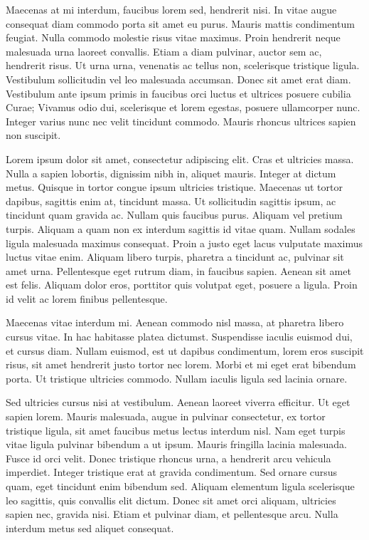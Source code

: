 Maecenas at mi interdum, faucibus lorem sed, hendrerit nisi. In vitae
augue consequat diam commodo porta sit amet eu purus. Mauris mattis
condimentum feugiat. Nulla commodo molestie risus vitae maximus. Proin
hendrerit neque malesuada urna laoreet convallis. Etiam a diam
pulvinar, auctor sem ac, hendrerit risus. Ut urna urna, venenatis ac
tellus non, scelerisque tristique ligula. Vestibulum sollicitudin vel
leo malesuada accumsan. Donec sit amet erat diam. Vestibulum ante
ipsum primis in faucibus orci luctus et ultrices posuere cubilia
Curae; Vivamus odio dui, scelerisque et lorem egestas, posuere
ullamcorper nunc. Integer varius nunc nec velit tincidunt
commodo. Mauris rhoncus ultrices sapien non suscipit.


Lorem ipsum dolor sit amet, consectetur adipiscing elit. Cras et
ultricies massa. Nulla a sapien lobortis, dignissim nibh in, aliquet
mauris. Integer at dictum metus. Quisque in tortor congue ipsum
ultricies tristique. Maecenas ut tortor dapibus, sagittis enim at,
tincidunt massa. Ut sollicitudin sagittis ipsum, ac tincidunt quam
gravida ac. Nullam quis faucibus purus. Aliquam vel pretium
turpis. Aliquam a quam non ex interdum sagittis id vitae quam. Nullam
sodales ligula malesuada maximus consequat. Proin a justo eget lacus
vulputate maximus luctus vitae enim. Aliquam libero turpis, pharetra a
tincidunt ac, pulvinar sit amet urna. Pellentesque eget rutrum diam,
in faucibus sapien. Aenean sit amet est felis. Aliquam dolor eros,
porttitor quis volutpat eget, posuere a ligula. Proin id velit ac
lorem finibus pellentesque.

Maecenas vitae interdum mi. Aenean commodo nisl massa, at pharetra
libero cursus vitae. In hac habitasse platea dictumst. Suspendisse
iaculis euismod dui, et cursus diam. Nullam euismod, est ut dapibus
condimentum, lorem eros suscipit risus, sit amet hendrerit justo
tortor nec lorem. Morbi et mi eget erat bibendum porta. Ut tristique
ultricies commodo. Nullam iaculis ligula sed lacinia ornare.

Sed ultricies cursus nisi at vestibulum. Aenean laoreet viverra
efficitur. Ut eget sapien lorem. Mauris malesuada, augue in pulvinar
consectetur, ex tortor tristique ligula, sit amet faucibus metus
lectus interdum nisl. Nam eget turpis vitae ligula pulvinar bibendum a
ut ipsum. Mauris fringilla lacinia malesuada. Fusce id orci
velit. Donec tristique rhoncus urna, a hendrerit arcu vehicula
imperdiet. Integer tristique erat at gravida condimentum. Sed ornare
cursus quam, eget tincidunt enim bibendum sed. Aliquam elementum
ligula scelerisque leo sagittis, quis convallis elit dictum. Donec sit
amet orci aliquam, ultricies sapien nec, gravida nisi. Etiam et
pulvinar diam, et pellentesque arcu. Nulla interdum metus sed aliquet
consequat.

